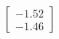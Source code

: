 \documentclass[preview]{standalone}
\begin{document}
\begin{align*}
\begin{bmatrix} -1.52 \\ -1.46 \end{bmatrix}
\end{align*}
\end{document}
